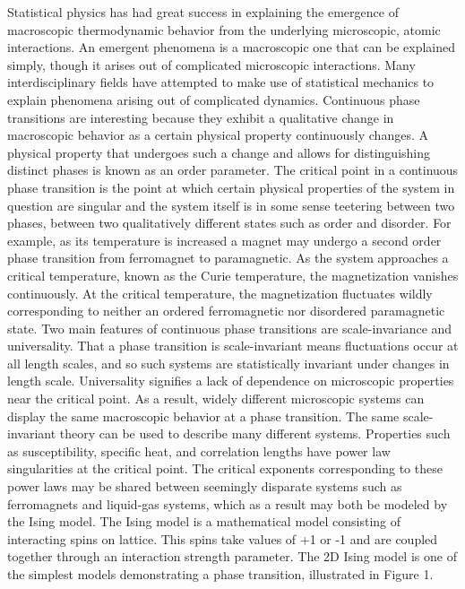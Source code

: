 \documentclass[12pt]{article}
\begin{document}
Statistical physics has had great success in explaining the emergence of macroscopic thermodynamic behavior from the underlying microscopic, atomic interactions. An emergent phenomena is a macroscopic one that can be explained simply, though it arises out of complicated microscopic interactions. Many interdisciplinary fields have attempted to make use of statistical mechanics to explain phenomena arising out of complicated dynamics. Continuous phase transitions are interesting because they exhibit a qualitative change in macroscopic behavior as a certain physical property continuously changes. A physical property that undergoes such a change and allows for distinguishing distinct phases is known as an order parameter. The critical point in a continuous phase transition is the point at which certain physical properties of the system in question are singular and the system itself is in some sense teetering between two phases, between two qualitatively different states such as order and disorder. For example, as its temperature is increased a magnet may undergo a second order phase transition from ferromagnet to paramagnetic. As the system approaches a critical temperature, known as the Curie temperature, the magnetization vanishes continuously. At the critical temperature, the magnetization fluctuates wildly corresponding to neither an ordered ferromagnetic nor disordered paramagnetic state. Two main features of continuous phase transitions are scale-invariance and universality. That a phase transition is scale-invariant means fluctuations occur at all length scales, and so such systems are statistically invariant under changes in length scale. Universality signifies a lack of dependence on microscopic properties near the critical point. As a result, widely different microscopic systems can display the same macroscopic behavior at a phase transition. The same scale-invariant theory can be used to describe many different systems. Properties such as susceptibility, specific heat, and correlation lengths have power law singularities at the critical point. The critical exponents corresponding to these power laws  may be shared between seemingly disparate systems such as ferromagnets and liquid-gas systems, which as a result may both be modeled by the Ising model. The Ising model is a mathematical model consisting of interacting spins on lattice. This spins take values of +1 or -1 and are coupled together through an interaction strength parameter. The 2D Ising model is one of the simplest models demonstrating a phase transition, illustrated in Figure 1. \cite{Sethna2011a}
\end{document}
